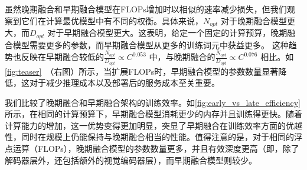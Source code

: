 虽然晚期融合和早期融合模型在FLOPs增加时以相似的速率减少损失，但我们观察到它们在计算最优模型中有不同的权衡。具体来说，$N_{opt}$ 对于晚期融合模型更大，而$D_{opt}$ 对于早期融合模型更大。这表明，给定一个固定的计算预算，晚期融合模型需要更多的参数，而早期融合模型从更多的训练词元中获益更多。  
这种趋势也反映在早期融合较低的$\frac{N_{opt}}{D_{opt}} \propto
C^{0.053}$ 中，与晚期融合的$\frac{N_{opt}}{D_{opt}} \propto
C^{0.076}$ 相比。如\cref{fig:teaser}~（右图）所示，当扩展FLOPs时，早期融合模型的参数数量显著降低，这对于减少推理成本以及部署后的服务成本至关重要。  




我们比较了晚期融合和早期融合架构的训练效率。如\cref{fig:early_vs_late_efficiency}所示，在相同的计算预算下，早期融合模型消耗更少的内存并且训练得更快。随着计算能力的增加，这一优势变得更加明显，突显了早期融合在训练效率方面的优越性，同时在规模上仍能保持与晚期融合相当的性能。值得注意的是，对于相同的浮点运算（FLOPs），晚期融合模型的参数数量更多，并且有效深度更高（即，除了解码器层外，还包括额外的视觉编码器层），而早期融合模型则较少。




